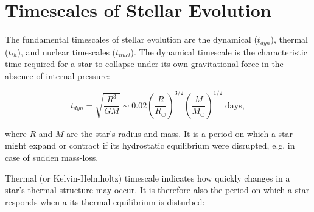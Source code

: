 \section{Timescales of Stellar Evolution}\label{subsec:timescales}

The fundamental timescales of stellar evolution are the dynamical ($t_{dyn}$), thermal ($t_{th}$), and nuclear timescales ($t_{nucl}$). The dynamical timescale is the characteristic time required for a star to collapse under its own gravitational force in the absence of internal pressure:

\begin{equation}\label{eq:dynamical_timsecale}
    t_{dyn} = \sqrt{\frac{R^3}{GM}} \sim 0.02 \left( \frac{R}{R_{\odot}} \right)^{3/2} \left( \frac{M}{M_{\odot}}\right)^{1/2} \; \text{days},
\end{equation}

where $R$ and $M$ are the star's radius and mass. It is a period on which a star might expand or contract if its hydrostatic equilibrium were disrupted, e.g. in case of sudden mass-loss.

Thermal (or Kelvin-Helmholtz) timescale indicates how quickly changes in a star's thermal structure may occur. It is therefore also the period on which a star responds when a its thermal equilibrium is disturbed:

